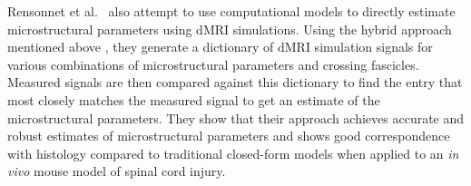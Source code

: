 Rensonnet et al.\ \cite{Rensonnet2018} also attempt to use computational models to directly estimate microstructural parameters using \ac{dMRI} simulations.
Using the hybrid approach mentioned above \cite{Rensonnet2015}, they generate a dictionary of \ac{dMRI} simulation signals for various combinations of microstructural parameters and crossing fascicles.
Measured signals are then compared against this dictionary to find the entry that most closely matches the measured signal to get an estimate of the microstructural parameters.
They show that their approach achieves accurate and robust estimates of microstructural parameters and shows good correspondence with histology compared to traditional closed-form models when applied to an \emph{in vivo} mouse model of spinal cord injury. 


\begin{comment}
\section{\ac{GPU} accelerated \ac{MC} simulations}
\label{sec:review_gpu}
There have been a couple of studies attempting to modify \ac{MC} \ac{dMRI} simulations for the \ac{GPU}.
The first, by Waudby and Christodoulou \cite{Waudby2011} implements a simple random walk on the \ac{GPU}, with a rejection sampling scheme to handle substrate boundaries.
In this case, a step crossing a boundary is ignored and no step is taken rather than being reflected.

Unlike other geometries studied in this report, the Waudby and Christodoulou work uses a binary representation for simple shapes, meaning that the collision check is as straightforward as checking whether a spin moves into a region of space that is disallowed.
One downside of this approach is that complex geometries cannot be easily represented in this binary manner.

Waudby and Christodoulou show that the \ac{GPU} implementation is able to replicate unoptimised \ac{CPU} and analytical solutions for simple geometries whilst achieving a 1000$\times$ speedup over the \ac{CPU} implementation.
It is mentioned, that with \ac{CPU} optimisation, this difference should reduce to around 20$\times$.

A second, more recent, \ac{GPU} accelerated \ac{dMRI} simulation has been reported by Nguyen et al.\ \cite{Nguyen2018}.
This implementation handles arbitrary meshes with two approaches, one with an octree acceleration scheme and one following a similar binary approach to Waudby and Christodoulou.
The octree scheme gives them a 45-65$\times$ acceleration over Camino with the binary \ac{GPU} version achieving a 2000$\times$ acceleration.
The binary representation in this work uses a uniform grid to divide the space.
Each cell in the grid is assigned a 1 or a 0 based on whether or not it is inside the mesh and a step is considered to have collided with the mesh if it steps from a cell with a 1 to a cell with a 0.


\end{comment}
